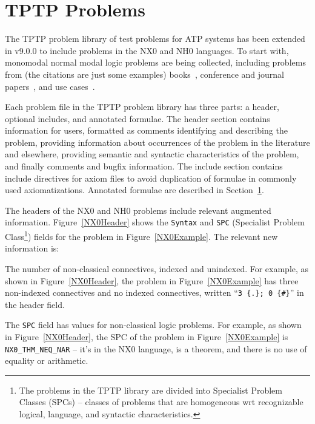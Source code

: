\documentclass{ceurart}
\newenvironment{packed_itemize}{
\vspace*{-0.3em}
\begin{itemize}
\setlength{\partopsep}{0pt}
\setlength{\itemsep}{1pt}
\setlength{\parskip}{0pt}
\setlength{\parsep}{0pt}
}{\end{itemize}}
\begin{document}
\section{TPTP Problems}
\label{TPTP}

The TPTP problem library of test problems for ATP systems has been extended in v9.0.0 to include
problems in the NX0 and NH0 languages.
To start with, monomodal normal modal logic problems are being collected, including problems 
from (the citations are just some examples)
books~\cite{For94,FM98,Gir00,Sid10}, 
conference and journal papers~\cite{Rei92,FH+98,Sto00,PN+21}, 
and 
use cases~\cite{BW14-ECAI,MR22}.

Each problem file in the TPTP problem library has three parts: a header, optional includes, and 
annotated formulae. 
The header section contains information for users, formatted as comments identifying and 
describing the problem, providing information about occurrences of the problem in the literature 
and elsewhere, providing semantic and syntactic characteristics of the problem, and finally
comments and bugfix information. 
The include section contains include directives for axiom files to avoid duplication of formulae 
in commonly used axiomatizations. 
Annotated formulae are described in Section~\ref{TPTP}.

The headers of the NX0 and NH0 problems include relevant augmented information.
Figure~\ref{NX0Header} shows the {\tt Syntax} and {\tt SPC} (Specialist Problem Class\footnote{%
The problems in the TPTP library are divided into Specialist Problem Classes (SPCs) – classes 
of problems that are homogeneous wrt recognizable logical, language, and syntactic
characteristics.}) fields for the problem in Figure~\ref{NX0Example}.
The relevant new information is:
\begin{packed_itemize}
\item The number of non-classical connectives, indexed and unindexed.
      For example, as shown in Figure~\ref{NX0Header}, the problem in Figure~\ref{NX0Example} 
      has three non-indexed connectives and no indexed connectives, written 
      ``{\tt 3 \{.\};   0 \{\#\}}'' in the header field.
\item The {\tt SPC} field has values for non-classical logic problems. 
      For example, as shown in Figure~\ref{NX0Header}, the SPC of the problem in 
      Figure~\ref{NX0Example} is {\tt NX0\_THM\_NEQ\_NAR} -- it's in the NX0 language, is a 
      theorem, and there is no use of equality or arithmetic.
\end{packed_itemize}
\end{document}
